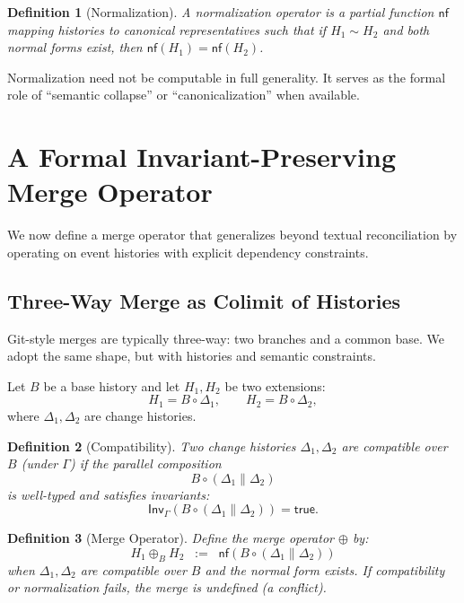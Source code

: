 \documentclass[11pt]{article}
\newtheorem{definition}{Definition}
\begin{document}
\begin{definition}[Normalization]
A \emph{normalization operator} is a partial function $\mathsf{nf}$ mapping histories to canonical representatives such that if $H_1 \sim H_2$ and both normal forms exist, then $\mathsf{nf}(H_1)=\mathsf{nf}(H_2)$.
\end{definition}

Normalization need not be computable in full generality. It serves as the formal role of ``semantic collapse'' or ``canonicalization'' when available.

\section{A Formal Invariant-Preserving Merge Operator}
\label{sec:formal_merge}

We now define a merge operator that generalizes beyond textual reconciliation by operating on event histories with explicit dependency constraints.

\subsection{Three-Way Merge as Colimit of Histories}

Git-style merges are typically three-way: two branches and a common base. We adopt the same shape, but with histories and semantic constraints.

Let $B$ be a base history and let $H_1, H_2$ be two extensions:
\[
H_1 = B \circ \Delta_1,
\qquad
H_2 = B \circ \Delta_2,
\]
where $\Delta_1,\Delta_2$ are change histories.

\begin{definition}[Compatibility]
Two change histories $\Delta_1,\Delta_2$ are \emph{compatible over} $B$ (under $\Gamma$) if the parallel composition
\[
B \circ (\Delta_1 \parallel \Delta_2)
\]
is well-typed and satisfies invariants:
\[
\mathsf{Inv}_\Gamma\!\left(B \circ (\Delta_1 \parallel \Delta_2)\right)=\mathsf{true}.
\]
\end{definition}

\begin{definition}[Merge Operator]
Define the merge operator $\oplus$ by:
\[
H_1 \oplus_B H_2 \;\;:=\;\; \mathsf{nf}\!\left(B \circ (\Delta_1 \parallel \Delta_2)\right)
\]
when $\Delta_1,\Delta_2$ are compatible over $B$ and the normal form exists. If compatibility or normalization fails, the merge is \emph{undefined} (a conflict).
\end{definition}
\end{document}
